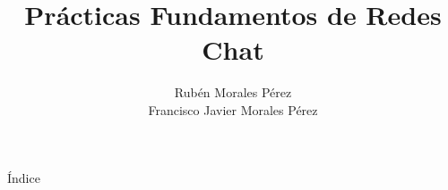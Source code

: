 \documentclass[compress]{beamer}
\title{Prácticas Fundamentos de Redes\\ Chat}
\author{Rubén Morales Pérez \\
		Francisco Javier Morales Pérez}
\date{ }
\begin{document}
\begin{frame}
\titlepage
\end{frame}

\begin{frame}{Índice}
  \hypertarget{index}{}
  \tableofcontents
\end{frame}
\end{document}
